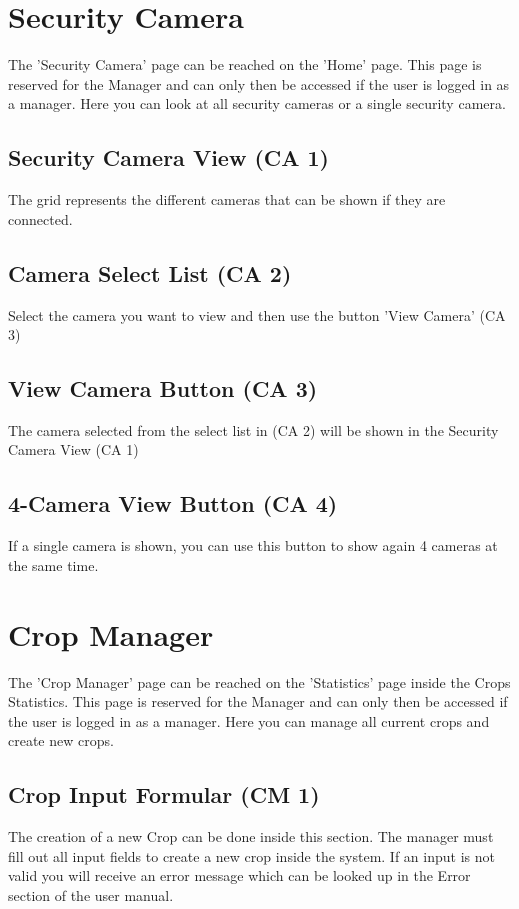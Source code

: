 \newpage
\section{Security Camera}
\label{sec:appendix_SecurityCamera}
\mbox{} \par
\noindent{}

The 'Security Camera' page can be reached on the 'Home' page. This page is
reserved for the Manager and can only then be accessed if the user is logged
in as a manager. Here you can look at all security cameras or a single security
camera.

\subsection{Security Camera View (CA 1)}
The grid represents the different cameras that can be shown if they are
connected.

\subsection{Camera Select List (CA 2)}
Select the camera you want to view and then use the button 'View Camera' (CA 3)

\subsection{View Camera Button (CA 3)}
The camera selected from the select list in (CA 2) will be shown in the Security
Camera View (CA 1)

\subsection{4-Camera View Button (CA 4)}
If a single camera is shown, you can use this button to show again 4 cameras at
the same time.



\newpage
\section{Crop Manager}
\label{sec:appendix_CropManager}
\mbox{} \par
\noindent{}

The 'Crop Manager' page can be reached on the 'Statistics' page inside the
Crops Statistics. This page is reserved for the Manager and can only then be
accessed if the user is logged in as a manager. Here you can manage all current
crops and create new crops.

\subsection{Crop Input Formular (CM 1)}
The creation of a new Crop can be done inside this section. The manager must
fill out all input fields to create a new crop inside the system. If an input is
not valid you will receive an error message which can be looked up in the Error
section of the user manual.







